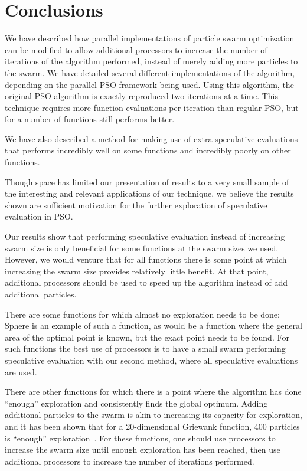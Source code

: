 \documentclass[conference,letterpaper]{IEEEtran}
\begin{document}
\section{Conclusions}
\label{sec:conclusion}

We have described how parallel implementations of particle swarm optimization
can be modified to allow additional processors to increase the number of
iterations of the algorithm performed, instead of merely adding more particles
to the swarm.  We have detailed several different implementations of the
algorithm, depending on the parallel PSO framework being used.  Using this
algorithm, the original PSO algorithm is exactly reproduced two iterations at a
time.  This technique requires more function evaluations per iteration than
regular PSO, but for a number of functions still performs better.

We have also described a method for making use of extra speculative evaluations
that performs incredibly well on some functions and incredibly poorly on other
functions.

Though space has limited our presentation of results to a very small sample of
the interesting and relevant applications of our technique, we believe the
results shown are sufficient motivation for the further exploration of
speculative evaluation in PSO.

Our results show that performing speculative evaluation instead of increasing
swarm size is only beneficial for some functions at the swarm sizes we used.
However, we would venture that for all functions there is some point at which
increasing the swarm size provides relatively little benefit.  At that point,
additional processors should be used to speed up the algorithm instead of add
additional particles.

There are some functions for which almost no exploration needs to be done;
Sphere is an example of such a function, as would be a function where the
general area of the optimal point is known, but the exact point needs to be
found.  For such functions the best use of processors is to have a small swarm
performing speculative evaluation with our second method, where all speculative
evaluations are used.

There are other functions for which there is a point where the algorithm has
done ``enough'' exploration and consistently finds the global optimum.  Adding
additional particles to the swarm is akin to increasing its capacity for
exploration, and it has been shown that for a 20-dimensional Griewank function,
400 particles is ``enough'' exploration~\cite{mcnabb-cec09}.  For these
functions, one should use processors to increase the swarm size until enough
exploration has been reached, then use additional processors to increase the
number of iterations performed.
\end{document}
